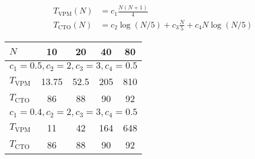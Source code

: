 \documentclass[a4paper]{article}
\begin{document}
\begin{align*}
  T_\text{VPM}(N) &= c_1 \frac{N(N+1)}{4} \\
  T_\text{CTO}(N) &= c_2\log(N/5) + c_3\frac{N}{5} + c_4N\log(N/5)
\end{align*}

\begin{tabular}{l|c|c|c|c}
  $N$            & 10    & 20   & 40  & 80  \\
  \hline
  \multicolumn{5}{l}{$c_1=0.5,c_2=2,c_3=3,c_4=0.5$} \\
  \hline
  $T_\text{VPM}$ & 13.75 & 52.5 & 205 & 810 \\
  $T_\text{CTO}$ & 86    & 88   &  90 &  92 \\
  \hline
  \multicolumn{5}{l}{$c_1=0.4,c_2=2,c_3=3,c_4=0.5$} \\
  \hline
  $T_\text{VPM}$ & 11    & 42   & 164 & 648 \\
  $T_\text{CTO}$ & 86    & 88   &  90 &  92
\end{tabular}
\end{document}
